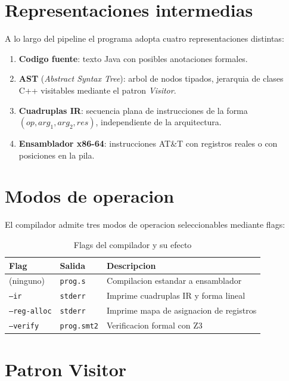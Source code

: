 \section{Representaciones intermedias}

A lo largo del pipeline el programa adopta cuatro representaciones distintas:

\begin{enumerate}
  \item \textbf{Codigo fuente}: texto Java con posibles anotaciones formales.
  \item \textbf{AST} (\emph{Abstract Syntax Tree}): arbol de nodos tipados,
    jerarquia de clases C++ visitables mediante el patron \emph{Visitor}.
  \item \textbf{Cuadruplas IR}: secuencia plana de instrucciones de la forma
    $(op, \mathit{arg}_1, \mathit{arg}_2, \mathit{res})$, independiente de la
    arquitectura.
  \item \textbf{Ensamblador x86-64}: instrucciones AT\&T con registros reales
    o con posiciones en la pila.
\end{enumerate}

\section{Modos de operacion}

El compilador admite tres modos de operacion seleccionables mediante flags:

\begin{table}[H]
  \centering
  \caption{Flags del compilador y su efecto}
  \label{tab:flags}
  \begin{tabular}{llp{7cm}}
    \toprule
    \textbf{Flag}        & \textbf{Salida}   & \textbf{Descripcion} \\
    \midrule
    (ninguno)            & \texttt{prog.s}   & Compilacion estandar a ensamblador \\
    \texttt{--ir}        & \texttt{stderr}   & Imprime cuadruplas IR y forma lineal \\
    \texttt{--reg-alloc} & \texttt{stderr}   & Imprime mapa de asignacion de registros \\
    \texttt{--verify}    & \texttt{prog.smt2}& Verificacion formal con Z3 \\
    \bottomrule
  \end{tabular}
\end{table}

\section{Patron Visitor}

